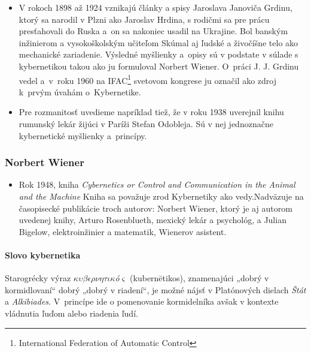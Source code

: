 \documentclass[a4paper, 10pt, ]{article}
\begin{document}
\begin{itemize}[leftmargin=0pt, labelsep=3mm, itemsep=0pt]
    \item V rokoch 1898 až 1924 vznikajú články a spisy Jaroslava Janoviča Grdinu, ktorý sa narodil v Plzni ako Jaroslav Hrdina, s rodičmi sa pre prácu presťahovali do Ruska a~on sa nakoniec usadil na Ukrajine. Bol banským inžinierom a vysokoškolským učiteľom \newline Skúmal aj ľudské a živočíšne telo ako mechanické zariadenie. Výsledné myšlienky a~opisy sú v podstate v súlade s kybernetikou takou ako ju formuloval Norbert Wiener. O~práci J. J. Grdinu vedel a~v~roku 1960 na IFAC\footnote{International Federation of Automatic Control} svetovom kongrese ju označil ako zdroj k~prvým úvahám o~Kybernetike.
    \item Pre rozmanitosť uvedieme napríklad tiež, že v roku 1938 uverejnil knihu rumunský lekár žijúci v Paríži Stefan Odobleja. Sú v nej jednoznačne kybernetické myšlienky a~princípy.
\end{itemize}


\subsubsection{Norbert Wiener}

\begin{itemize}[leftmargin=0pt, labelsep=3mm, itemsep=0pt]
    \item Rok 1948, kniha \emph{Cybernetics or Control and Communication in the Animal and the Machine} \newline Kniha sa považuje zrod Kybernetiky ako vedy.\newline Nadväzuje na časopisecké publikácie troch autorov: Norbert Wiener, ktorý je aj autorom uvedenej knihy, Arturo Rosenblueth, mexický lekár a psychológ, a Julian Bigelow, elektroinžinier a matematik, Wienerov asistent.
\end{itemize}




\paragraph{Slovo kybernetika}

Starogrécky výraz $\kappa\upsilon\beta\epsilon\rho\nu\eta\tau\iota\kappa$\textit{ó}$\varsigma$ (kubernētikos), znamenajúci „dobrý v kormidlovaní“ dobrý „dobrý v riadení“, je možné nájsť v Platónových dielach \emph{Štát} a \emph{Alkibiades}. V~princípe ide o pomenovanie kormidelníka avšak v kontexte vládnutia ľuďom alebo riadenia ľudí.
\end{document}
